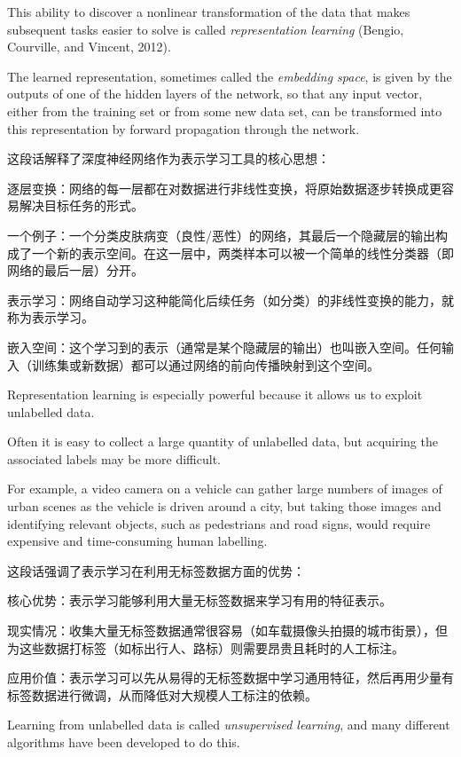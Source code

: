 \documentclass{article}
\begin{document}
This ability to discover a nonlinear transformation of the data that makes subsequent tasks easier to solve is called \emph{representation learning} (Bengio, Courville, and Vincent, 2012). 

The learned representation, sometimes called the \emph{embedding space}, is given by the outputs of one of the hidden layers of the network, so that any input vector, either from the training set or from some new data set, can be transformed into this representation by forward propagation through the network.

{\color{red}
这段话解释了深度神经网络作为表示学习工具的核心思想：

逐层变换：网络的每一层都在对数据进行非线性变换，将原始数据逐步转换成更容易解决目标任务的形式。

一个例子：一个分类皮肤病变（良性/恶性）的网络，其最后一个隐藏层的输出构成了一个新的表示空间。在这一层中，两类样本可以被一个简单的线性分类器（即网络的最后一层）分开。

表示学习：网络自动学习这种能简化后续任务（如分类）的非线性变换的能力，就称为表示学习。

嵌入空间：这个学习到的表示（通常是某个隐藏层的输出）也叫嵌入空间。任何输入（训练集或新数据）都可以通过网络的前向传播映射到这个空间。
}

Representation learning is especially powerful because it allows us to exploit unlabelled data. 

Often it is easy to collect a large quantity of unlabelled data, but acquiring the associated labels may be more difficult. 

For example, a video camera on a vehicle can gather large numbers of images of urban scenes as the vehicle is driven around a city, but taking those images and identifying relevant objects, such as pedestrians and road signs, would require expensive and time-consuming human labelling.

{\color{red}
这段话强调了表示学习在利用无标签数据方面的优势：

核心优势：表示学习能够利用大量无标签数据来学习有用的特征表示。

现实情况：收集大量无标签数据通常很容易（如车载摄像头拍摄的城市街景），但为这些数据打标签（如标出行人、路标）则需要昂贵且耗时的人工标注。

应用价值：表示学习可以先从易得的无标签数据中学习通用特征，然后再用少量有标签数据进行微调，从而降低对大规模人工标注的依赖。
}

Learning from unlabelled data is called \emph{unsupervised learning}, and many different algorithms have been developed to do this. 
\end{document}
